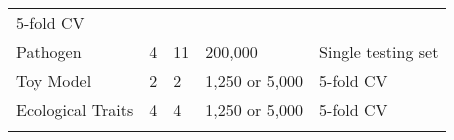 \documentclass[]{article}
\begin{document}
\begin{longtable}[]{@{}lllll@{}}
\begin{minipage}[t]{0.15\columnwidth}
5-fold CV\strut
\end{minipage}\tabularnewline
\begin{minipage}[t]{0.20\columnwidth}\raggedright
Pathogen\strut
\end{minipage} & \begin{minipage}[t]{0.15\columnwidth}\raggedright
4\strut
\end{minipage} & \begin{minipage}[t]{0.21\columnwidth}\raggedright
11\strut
\end{minipage} & \begin{minipage}[t]{0.15\columnwidth}\raggedright
200,000\strut
\end{minipage} & \begin{minipage}[t]{0.15\columnwidth}\raggedright
Single testing set\strut
\end{minipage}\tabularnewline
\begin{minipage}[t]{0.20\columnwidth}\raggedright
Toy Model\strut
\end{minipage} & \begin{minipage}[t]{0.15\columnwidth}\raggedright
2\strut
\end{minipage} & \begin{minipage}[t]{0.21\columnwidth}\raggedright
2\strut
\end{minipage} & \begin{minipage}[t]{0.15\columnwidth}\raggedright
1,250 or 5,000\strut
\end{minipage} & \begin{minipage}[t]{0.15\columnwidth}\raggedright
5-fold CV\strut
\end{minipage}\tabularnewline
\begin{minipage}[t]{0.20\columnwidth}\raggedright
Ecological Traits\strut
\end{minipage} & \begin{minipage}[t]{0.15\columnwidth}\raggedright
4\strut
\end{minipage} & \begin{minipage}[t]{0.21\columnwidth}\raggedright
4\strut
\end{minipage} & \begin{minipage}[t]{0.15\columnwidth}\raggedright
1,250 or 5,000\strut
\end{minipage} & \begin{minipage}[t]{0.15\columnwidth}\raggedright
5-fold CV\strut
\end{minipage}\tabularnewline
\begin{minipage}[t]{0.20\columnwidth}\raggedright

\end{minipage}
\end{longtable}
\end{document}
